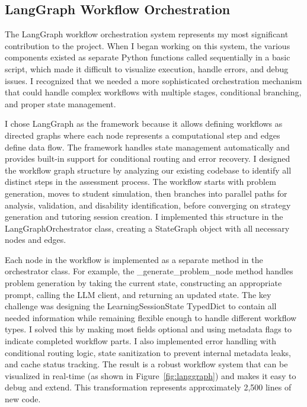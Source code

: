 \documentclass[11pt]{article}
\begin{document}
\subsection{LangGraph Workflow Orchestration}

The LangGraph workflow orchestration system represents my most significant contribution to the project. When I began working on this system, the various components existed as separate Python functions called sequentially in a basic script, which made it difficult to visualize execution, handle errors, and debug issues. I recognized that we needed a more sophisticated orchestration mechanism that could handle complex workflows with multiple stages, conditional branching, and proper state management.

I chose LangGraph as the framework because it allows defining workflows as directed graphs where each node represents a computational step and edges define data flow. The framework handles state management automatically and provides built-in support for conditional routing and error recovery. I designed the workflow graph structure by analyzing our existing codebase to identify all distinct steps in the assessment process. The workflow starts with problem generation, moves to student simulation, then branches into parallel paths for analysis, validation, and disability identification, before converging on strategy generation and tutoring session creation. I implemented this structure in the LangGraphOrchestrator class, creating a StateGraph object with all necessary nodes and edges.

Each node in the workflow is implemented as a separate method in the orchestrator class. For example, the \_generate\_problem\_node method handles problem generation by taking the current state, constructing an appropriate prompt, calling the LLM client, and returning an updated state. The key challenge was designing the LearningSessionState TypedDict to contain all needed information while remaining flexible enough to handle different workflow types. I solved this by making most fields optional and using metadata flags to indicate completed workflow parts. I also implemented error handling with conditional routing logic, state sanitization to prevent internal metadata leaks, and cache status tracking. The result is a robust workflow system that can be visualized in real-time (as shown in Figure~\ref{fig:langgraph}) and makes it easy to debug and extend. This transformation represents approximately 2,500 lines of new code.
\end{document}

